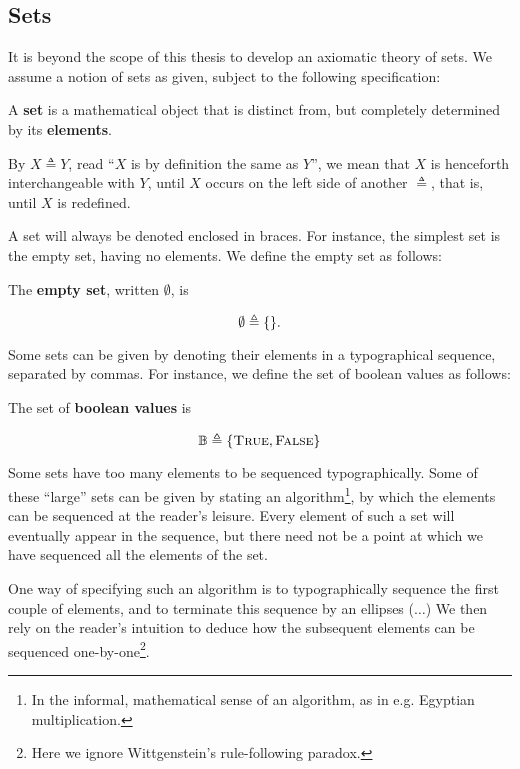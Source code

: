 \subsection{Sets}

It is beyond the scope of this thesis to develop an axiomatic theory of sets.
We assume a notion of sets as given, subject to the following specification:

\begin{specification} A \textbf{set} is a mathematical object that is distinct
from, but completely determined by its \textbf{elements}. \end{specification}

\begin{notation} By $X\triangleq Y$, read ``$X$ is by definition the same as
$Y$'', we mean that $X$ is henceforth interchangeable with $Y$, until $X$
occurs on the left side of another $\triangleq$, that is, until $X$ is
redefined. \end{notation}

A set will always be denoted enclosed in braces. For instance, the simplest set
is the empty set, having no elements. We define the empty set as follows:

\begin{definition} The \textbf{empty set}, written $\emptyset$, is

$$\emptyset\triangleq\mathopen{}\left\{{}\right\}\mathclose{}.$$

\end{definition}

Some sets can be given by denoting their elements in a typographical sequence,
separated by commas. For instance, we define the set of boolean values as follows:

\begin{definition} The set of \textbf{boolean values} is

$$\mathbb{B}\triangleq\mathopen{}\left\{{\text{\textsc{True}},\text{\textsc{False}}}\right\}\mathclose{}$$

\end{definition}

Some sets have too many elements to be sequenced typographically. Some of these
``large'' sets can be given by stating an algorithm\footnote{In the informal,
mathematical sense of an algorithm, as in e.g. Egyptian multiplication.}, by
which the elements can be sequenced at the reader's leisure.  Every element of
such a set will eventually appear in the sequence, but there need not be a
point at which we have sequenced all the elements of the set.

One way of specifying such an algorithm is to typographically sequence the
first couple of elements, and to terminate this sequence by an ellipses
($\ldots$) We then rely on the reader's intuition to deduce how the subsequent
elements can be sequenced one-by-one\footnote{Here we ignore Wittgenstein's
rule-following paradox.}.

